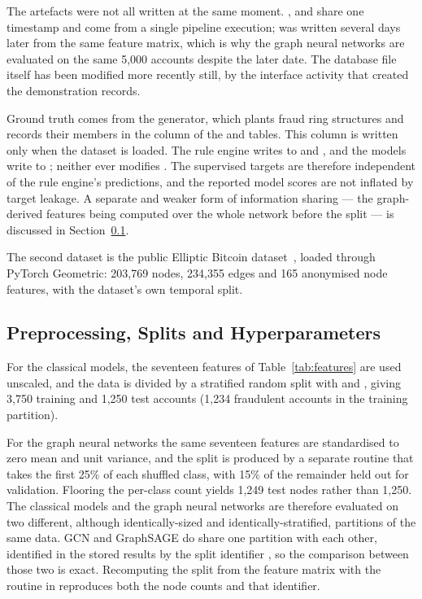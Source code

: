The artefacts were not all written at the same moment. ,  and  share one timestamp and come from a single pipeline execution;  was written several days later from the same feature matrix, which is why the graph neural networks are evaluated on the same 5,000 accounts despite the later date. The database file itself has been modified more recently still, by the interface activity that created the demonstration records.

Ground truth comes from the generator, which plants fraud ring structures and records their members in the  column of the  and  tables. This column is written only when the dataset is loaded. The rule engine writes to  and , and the models write to ; neither ever modifies . The supervised targets are therefore independent of the rule engine's predictions, and the reported model scores are not inflated by target leakage. A separate and weaker form of information sharing --- the graph-derived features being computed over the whole network before the split --- is discussed in Section~\ref{sec:splits}.

The second dataset is the public Elliptic Bitcoin dataset~\cite{weber2019}, loaded through PyTorch Geometric: 203,769 nodes, 234,355 edges and 165 anonymised node features, with the dataset's own temporal split.

\subsection{Preprocessing, Splits and Hyperparameters}\label{sec:splits}
For the classical models, the seventeen features of Table~\ref{tab:features} are used unscaled, and the data is divided by a stratified random split with  and , giving 3,750 training and 1,250 test accounts (1,234 fraudulent accounts in the training partition).

For the graph neural networks the same seventeen features are standardised to zero mean and unit variance, and the split is produced by a separate routine that takes the first 25\% of each shuffled class, with 15\% of the remainder held out for validation. Flooring the per-class count yields 1,249 test nodes rather than 1,250. The classical models and the graph neural networks are therefore evaluated on two different, although identically-sized and identically-stratified, partitions of the same data. GCN and GraphSAGE do share one partition with each other, identified in the stored results by the split identifier , so the comparison between those two is exact. Recomputing the split from the feature matrix with the routine in  reproduces both the node counts and that identifier.

